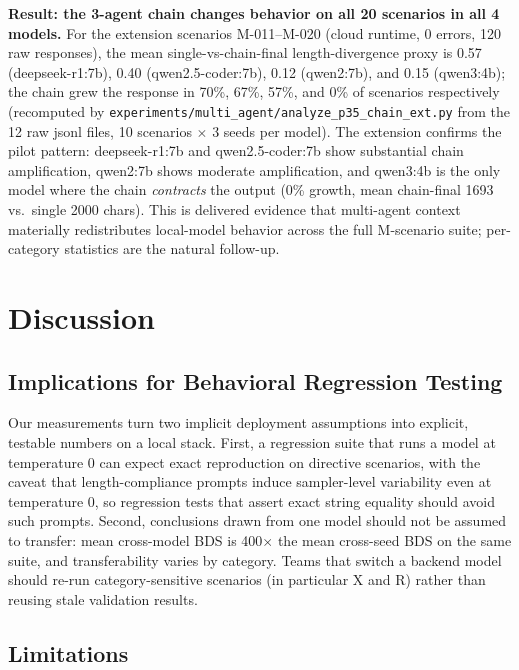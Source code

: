 \documentclass[11pt]{article}
\begin{document}
\textbf{Result: the 3-agent chain changes behavior on all 20 scenarios in
all 4 models.} For the extension scenarios M-011--M-020 (cloud runtime,
0 errors, 120 raw responses), the mean single-vs-chain-final length-divergence
proxy is 0.57 (deepseek-r1:7b), 0.40 (qwen2.5-coder:7b), 0.12 (qwen2:7b),
and 0.15 (qwen3:4b); the chain grew the response in 70\%, 67\%, 57\%, and
0\% of scenarios respectively (recomputed by
\texttt{experiments/multi\_agent/analyze\_p35\_chain\_ext.py} from the 12
raw jsonl files, 10 scenarios $\times$ 3 seeds per model). The extension
confirms the pilot pattern: deepseek-r1:7b and qwen2.5-coder:7b show
substantial chain amplification, qwen2:7b shows moderate amplification, and
qwen3:4b is the only model where the chain \emph{contracts} the output
(0\% growth, mean chain-final 1693 vs.\ single 2000 chars). This is
delivered evidence that multi-agent context materially redistributes
local-model behavior across the full \textsc{M}-scenario suite; per-category
statistics are the natural follow-up.

\section{Discussion}
\label{sec:discussion}

\subsection{Implications for Behavioral Regression Testing}

Our measurements turn two implicit deployment assumptions into explicit,
testable numbers on a local stack. First, a regression suite that runs a
model at temperature 0 can expect exact reproduction on directive
scenarios, with the caveat that length-compliance prompts induce
sampler-level variability even at temperature 0, so regression tests that
assert exact string equality should avoid such prompts. Second, conclusions
drawn from one model should not be assumed to transfer: mean cross-model
BDS is 400$\times$ the mean cross-seed BDS on the same suite, and
transferability varies by category. Teams that switch a backend model
should re-run category-sensitive scenarios (in particular \textsc{X} and
\textsc{R}) rather than reusing stale validation results.

\subsection{Limitations}
\end{document}
